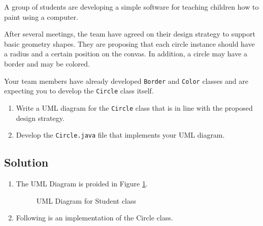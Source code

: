 \documentclass[12pt,letterpaper,twoside]{article}
\begin{document}
A group of students are developing a simple software for teaching children how to paint using a computer.

After several meetings, the team have agreed on their design strategy to support basic geometry shapes.
They are proposing that each circle instance should have a radius and a certain position on the convas. In addition, a circle may have a border and may be colored.

Your team members have already developed \texttt{Border} and \texttt{Color} classes and are expecting you to develop the \texttt{Circle} class itself.

\begin{enumerate}
	\item Write a UML diagram for the \texttt{Circle} class that is in line with the proposed design strategy.
	\item Develop the \texttt{Circle.java} file that implements your UML diagram.
\end{enumerate}

\subsection*{Solution}

\begin{enumerate}

	\item The UML Diagram is proided in Figure \ref{figQ6}.

	\begin{figure}[H]
		\centering
		\caption{UML Diagram for Student class}\label{figQ6}
	\end{figure}

	\newpage

	\item Following is an implementation of the Circle class.

	

\end{enumerate}
\end{document}
